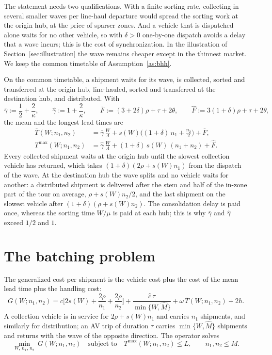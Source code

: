 \documentclass[10pt, reqno]{amsart}
\theoremstyle{definition}
\begin{document}
The statement needs two qualifications. With a finite sorting rate, collecting in several smaller waves per line-haul departure would spread the sorting work at the origin hub, at the price of sparser zones. And a vehicle that is dispatched alone waits for no other vehicle, so with $\delta>0$ one-by-one dispatch avoids a delay that a wave incurs; this is the cost of synchronization. In the illustration of Section~\ref{sec:illustration} the wave remains cheaper except in the thinnest market. We keep the common timetable of Assumption~\ref{as:bhh}.

On the common timetable, a shipment waits for its wave, is collected, sorted and transferred at the origin hub, line-hauled, sorted and transferred at the destination hub, and distributed. With
\[
\bar\gamma:=\frac12+\frac2\kappa,\qquad \hat\gamma:=1+\frac2\kappa,\qquad \bar F:=(3+2\delta)\rho+\tau+2\theta,\qquad \hat F:=3(1+\delta)\rho+\tau+2\theta,
\]
the mean and the longest lead times are
\begin{align}
\bar T(W;n_1,n_2)&=\bar\gamma\,\frac W\Lambda+s(W)\Big((1+\delta)\,n_1+\frac{n_2}2\Big)+\bar F,\label{eq:Tmean}\\
T^{\max}(W;n_1,n_2)&=\hat\gamma\,\frac W\Lambda+(1+\delta)\,s(W)\,(n_1+n_2)+\hat F.\label{eq:Tmax}
\end{align}
Every collected shipment waits at the origin hub until the slowest collection vehicle has returned, which takes $(1+\delta)(2\rho+s(W)n_1)$ from the dispatch of the wave. At the destination hub the wave splits and no vehicle waits for another: a distributed shipment is delivered after the stem and half of the in-zone part of the tour on average, $\rho+s(W)n_2/2$, and the last shipment on the slowest vehicle after $(1+\delta)(\rho+s(W)n_2)$. The consolidation delay is paid once, whereas the sorting time $W/\mu$ is paid at each hub; this is why $\bar\gamma$ and $\hat\gamma$ exceed $1/2$ and $1$.

\section{The batching problem}

The generalized cost per shipment is the vehicle cost plus the cost of the mean lead time plus the handling cost:
\begin{equation}\label{eq:G}
G(W;n_1,n_2)=c\Big[2s(W)+\frac{2\rho}{n_1}+\frac{2\rho}{n_2}\Big]+\frac{\hat c\,\tau}{\min\{W,\hat M\}}+\omega\,\bar T(W;n_1,n_2)+2h .
\end{equation}
A collection vehicle is in service for $2\rho+s(W)n_1$ and carries $n_1$ shipments, and similarly for distribution; an AV trip of duration $\tau$ carries $\min\{W,\hat M\}$ shipments and returns with the wave of the opposite direction. The operator solves
\begin{equation}\label{eq:P}
\min_{W,\,n_1,\,n_2}\ G(W;n_1,n_2)\quad\text{subject to}\quad T^{\max}(W;n_1,n_2)\le L,\qquad n_1,n_2\le M .
\end{equation}
\end{document}

